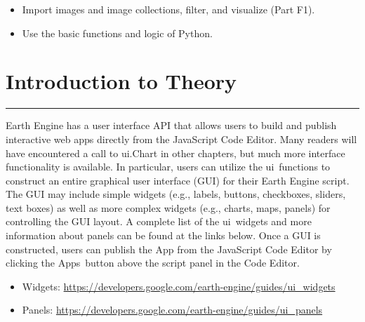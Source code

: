 \documentclass[
  letterpaper,
  DIV=11,
  numbers=noendperiod]{scrreprt}
\providecommand{\tightlist}{%
  \setlength{\itemsep}{0pt}\setlength{\parskip}{0pt}}\usepackage{longtable,booktabs,array}
\begin{document}
\begin{itemize}
\tightlist
\item
  Import images and image collections, filter, and visualize (Part F1).
\item
  Use the basic functions and logic of Python.
\end{itemize}

\hypertarget{introduction-to-theory-17}{%
\section*{Introduction to Theory}\label{introduction-to-theory-17}}


\begin{center}\rule{0.5\linewidth}{0.5pt}\end{center}

Earth Engine has a user interface API that allows users to build and
publish interactive web apps directly from the JavaScript Code Editor.
Many readers will have encountered a call to ui.Chart in other chapters,
but much more interface functionality is available. In particular, users
can utilize the ui~functions to construct an entire graphical user
interface (GUI) for their Earth Engine script. The GUI may include
simple widgets (e.g., labels, buttons, checkboxes, sliders, text boxes)
as well as more complex widgets (e.g., charts, maps, panels) for
controlling the GUI layout. A complete list of the ui~widgets and more
information about panels can be found at the links below. Once a GUI is
constructed, users can publish the App from the JavaScript Code Editor
by clicking the Apps~button above the script panel in the Code Editor.

\begin{itemize}
\tightlist
\item
  Widgets:
  \href{https://www.google.com/url?q=https://developers.google.com/earth-engine/guides/ui_widgets\&sa=D\&source=editors\&ust=1671458841273029\&usg=AOvVaw10aLP4KU7kHJTwcnM5Pr4-}{https://developers.google.com/earth-engine/guides/ui\_widgets}
\item
  Panels:
  \href{https://www.google.com/url?q=https://developers.google.com/earth-engine/guides/ui_panels\&sa=D\&source=editors\&ust=1671458841273501\&usg=AOvVaw1XwxHFyCULBnago_-VpDUq}{https://developers.google.com/earth-engine/guides/ui\_panels}~
\end{itemize}
\end{document}
